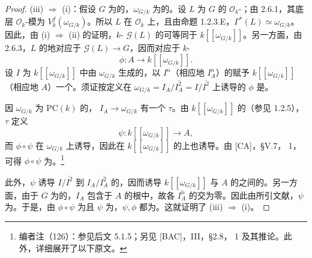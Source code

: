 \begin{proof}
(iii) $\Rightarrow$ (i)：假设 $G$ 为的，$\omega_{G/k}$ 为的。设 $L$ 为 $G$ 的 $\mathscr O_k$-；由 2.6.1，其底层 $\mathscr O_k$-模为 $V_k^f(\omega_{G/k})$。所以 $L$ 在 $\mathscr O_k$ 上，且由命题 1.2.3.E，$\Gamma^*(L)\simeq\omega_{G/k}$。因此，由 (i) $\Rightarrow$ (ii) 的证明，$k$- $\mathscr G(L)$ 的可等同于 $k[[\omega_{G/k}]]$。另一方面，由 2.6.3，$L$ 的地对应于 $\mathscr G(L)\to G$，因而对应于 $k$-
\[
\phi:A\longrightarrow k[[\omega_{G/k}]].
\]
设 $I$ 为 $k[[\omega_{G/k}]]$ 中由 $\omega_{G/k}$ 生成的，以 $I^n$（相应地 $I_A^n$）的赋予 $k[[\omega_{G/k}]]$（相应地 $A$）一个。须证按定义在 $\omega_{G/k}=I_A/\overline{I_A^2}=I/\overline{I^2}$ 上诱导的 $\phi$ 是。

因 $\omega_{G/k}$ 为 $\mathrm{PC}(k)$ 的， $I_A\to\omega_{G/k}$ 有一个 $\tau$。由 $k[[\omega_{G/k}]]$ 的（参见 1.2.5），$\tau$ 定义
\[
\psi:k[[\omega_{G/k}]]\longrightarrow A,
\]
而 $\phi\circ\psi$ 在 $\omega_{G/k}$ 上诱导，因此在 $k[[\omega_{G/k}]]$ 的上也诱导。由 [CA]，§V.7， 1，可得 $\phi\circ\psi$ 为。\footnote{编者注（126）：参见后文 5.1.5；另见 [BAC]，III，§2.8， 1 及其推论。此外，详细展开了以下原文。}

此外，$\psi$ 诱导 $I/\overline{I^2}$ 到 $I_A/\overline{I_A^2}$ 的，因而诱导 $k[[\omega_{G/k}]]$ 与 $A$ 的之间的。另一方面，由于 $G$ 为的，$I_A$ 包含于 $A$ 的根中，故各 $\overline{I_A^n}$ 的交为零。因此由所引文献，$\psi$ 为。于是，由 $\phi\circ\psi$ 为且 $\psi$ 为，$\psi,\phi$ 都为。这就证明了 (iii) $\Rightarrow$ (i)。


\end{proof}
